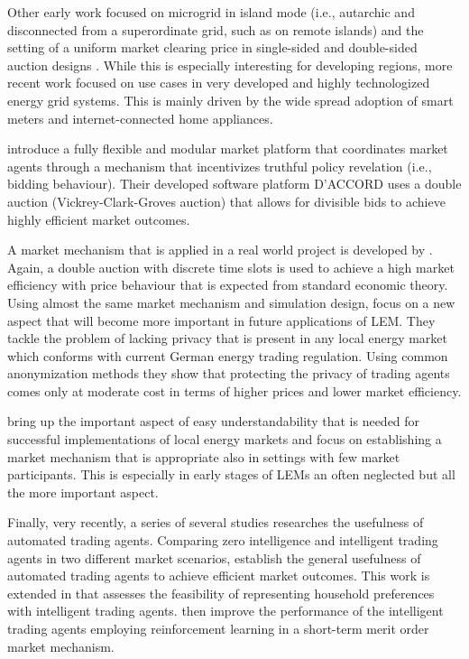 Other early work focused on microgrid in island mode (i.e., autarchic and disconnected from a superordinate grid, such as on remote islands) and the setting of a uniform market clearing price in single-sided and double-sided auction designs \citep{Sinha:2008}. While this is especially interesting for developing regions, more recent work focused on use cases in very developed and highly technologized energy grid systems. This is mainly driven by the wide spread adoption of smart meters and internet-connected home appliances.

\citet{Lamparter:2010} introduce a fully flexible and modular market platform that coordinates market agents through a mechanism that incentivizes truthful policy revelation (i.e., bidding behaviour). Their developed software platform D'ACCORD uses a double auction (Vickrey-Clark-Groves auction) that allows for divisible bids to achieve highly efficient market outcomes.

A market mechanism that is applied in a real world project is developed by \citet{Ilic:2012}. Again, a double auction with discrete time slots is used to achieve a high market efficiency with price behaviour that is expected from standard economic theory. Using almost the same market mechanism and simulation design, \citet{Buchmann:2013} focus on a new aspect that will become more important in future applications of LEM. They tackle the problem of lacking privacy that is present in any local energy market which conforms with current German energy trading regulation. Using common anonymization methods they show that protecting the privacy of trading agents comes only at moderate cost in terms of higher prices and lower market efficiency.

\citet{Rosen:2013} bring up the important aspect of easy understandability that is needed for successful implementations of local energy markets and focus on establishing a market mechanism that is appropriate also in settings with few market participants. This is especially in early stages of LEMs an often neglected but all the more important aspect.

Finally, very recently, a series of several studies researches the usefulness of automated trading agents. Comparing zero intelligence and intelligent trading agents in two different market scenarios, \citet{Mengelkamp:2017:Trading} establish the general usefulness of automated trading agents to achieve efficient market outcomes. This work is extended in \citet{Mengelkamp:2018:Clustering} that assesses the feasibility of representing household preferences with intelligent trading agents. \citet{Mengelkamp2018c} then improve the performance of the intelligent trading agents employing reinforcement learning in a short-term merit order market mechanism.



